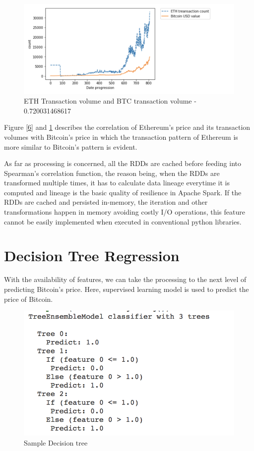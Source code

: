 \documentclass[sigconf]{acmart}
\begin{document}
\begin{figure}[!ht]
  \centering\includegraphics[width=\columnwidth]{images/ethtrancount.png}
  \caption{ETH Transaction volume and BTC transaction volume - 0.720031468617 }
  \label{7}
\end{figure}

Figure \ref{6} and \ref{7} describes the correlation of Ethereum's price and its transaction volumes with Bitcoin's price in which the transaction pattern of Ethereum is more similar to Bitcoin's pattern is evident. 

As far as processing is concerned, all the RDDs are cached before feeding into Spearman's correlation function, the reason being, when the RDDs are transformed multiple times, it has to calculate data lineage everytime it is computed and lineage is the basic quality of resilience in Apache Spark. If the RDDs are cached and persisted in-memory, the iteration and other transformations happen in memory avoiding costly I/O operations, this feature cannot be easily implemented when executed in conventional python libraries.


\section{Decision Tree Regression}
With the availability of features, we can take the processing to the next level of predicting Bitcoin's price. Here, supervised learning model is used to predict the price of Bitcoin.

\begin{figure}[!ht]
  \centering\includegraphics[width=0.75\columnwidth]{images/Decisiontree.png}
  \caption{Sample Decision tree}
  \label{fig:8decisiongree}
\end{figure}
 
\end{document}
